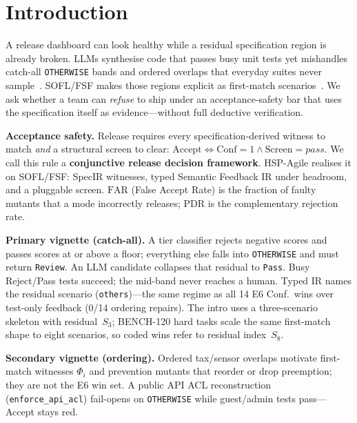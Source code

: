 \documentclass[10pt,conference]{IEEEtran}
\newcommand{\runin}[1]{\medskip\noindent\textbf{#1}\enspace}
\begin{document}
\section{Introduction}
A release dashboard can look healthy while a residual specification region is
already broken.
LLMs synthesise code that passes busy unit tests yet mishandles catch-all
\texttt{OTHERWISE} bands and ordered overlaps that everyday suites never
sample~\cite{chen2021codex,dakhel2023copilot,zhu1997specification}.
SOFL/FSF makes those regions explicit as first-match
scenarios~\cite{liu1998sofl,liu2004soflbook,li2022qrs_companion}.
We ask whether a team can \emph{refuse} to ship under an acceptance-safety bar
that uses the specification itself as evidence---without full deductive
verification.

\runin{Acceptance safety.}
Release requires every specification-derived witness to match \emph{and} a
structural screen to clear:
$\mathrm{Accept}\Leftrightarrow\mathrm{Conf}{=}1\wedge\mathrm{Screen}{=}\mathit{pass}$.
We call this rule a \textbf{conjunctive release decision framework}.
HSP-Agile realises it on SOFL/FSF: SpecIR witnesses, typed Semantic Feedback IR
under headroom, and a pluggable screen.
$\mathrm{FAR}$ (False Accept Rate) is the fraction of faulty mutants that a
mode incorrectly releases; $\mathrm{PDR}$ is the complementary rejection rate.

\runin{Primary vignette (catch-all).}
A tier classifier rejects negative scores and passes scores at or above a
floor; everything else falls into \texttt{OTHERWISE} and must return
\texttt{Review}.
An LLM candidate collapses that residual to \texttt{Pass}.
Busy Reject/Pass tests succeed; the mid-band never reaches a human.
Typed IR names the residual scenario (\texttt{others})---the same regime as
all 14 E6 Conf.\ wins over test-only feedback (0/14 ordering repairs).
The intro uses a three-scenario skeleton with residual~$S_3$; BENCH-120 hard
tasks scale the same first-match shape to eight scenarios, so coded wins
refer to residual index~$S_8$.

\runin{Secondary vignette (ordering).}
Ordered tax/sensor overlaps motivate first-match witnesses $\Phi_i$ and
prevention mutants that reorder or drop preemption; they are not the E6 win
set.
A public API ACL reconstruction (\texttt{enforce\_api\_acl}) fail-opens on
\texttt{OTHERWISE} while guest/admin tests pass---Accept stays red.
\end{document}
